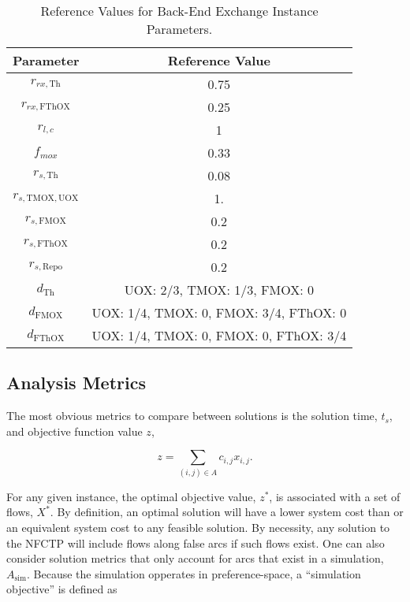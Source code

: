 \begin{table}[h!]
\centering
\caption{Reference Values for Back-End Exchange Instance Parameters.}
\label{tbl:back_ref_params}
\begin{tabular}{|c|c|}
\hline
Parameter    & Reference Value
\\ \hline
$r_{rx, \text{Th}}$   & 0.75 
\\ \hline
$r_{rx, \text{FThOX}}$ & 0.25
\\ \hline
$r_{l, c}$ & 1
\\ \hline
$f_{mox}$     & 0.33
\\ \hline
$r_{s, \text{Th}}$ & 0.08
\\ \hline
$r_{s, \text{TMOX}, \text{UOX}}$ & 1.
\\ \hline
$r_{s, \text{FMOX}}$ & 0.2
\\ \hline
$r_{s, \text{FThOX}}$ & 0.2
\\ \hline
$r_{s, \text{Repo}}$   & 0.2
\\ \hline
$d_{\text{Th}}$   & {UOX: 2/3, TMOX: 1/3, FMOX: 0}
\\ \hline
$d_{\text{FMOX}}$   & {UOX: 1/4, TMOX: 0, FMOX: 3/4, FThOX: 0}
\\ \hline
$d_{\text{FThOX}}$   & {UOX: 1/4, TMOX: 0, FMOX: 0, FThOX: 3/4}
\\ \hline
\end{tabular}
\end{table}

\subsection{Analysis Metrics}

The most obvious metrics to compare between solutions is the solution time,
$t_s$, and objective function value $z$,

\begin{equation}\label{eqn:obj_flow}
z = \sum_{(i, j) \in A} c_{i, j} x_{i, j}.
\end{equation}

For any given instance, the optimal objective value, $z^*$, is associated with a
set of flows, $X^*$. By definition, an optimal solution will have a lower system
cost than or an equivalent system cost to any feasible solution. By necessity,
any solution to the NFCTP will include flows along false arcs if such flows
exist. One can also consider solution metrics that only account for arcs that
exist in a simulation, $A_{\text{sim}}$. Because the simulation opperates in
preference-space, a ``simulation objective'' is defined as

